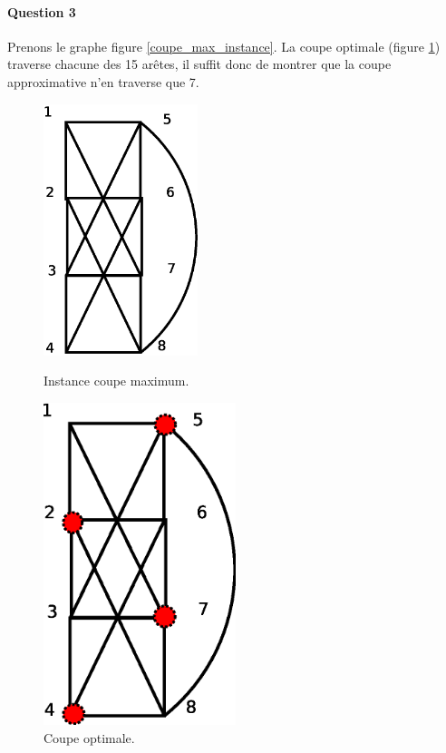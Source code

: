 \paragraph{Question 3}

Prenons le graphe figure \ref{coupe_max_instance}. La coupe optimale
(figure \ref{coupe_max_opt}) traverse chacune des 15 arêtes, il suffit
donc de montrer que la coupe approximative n'en traverse que 7.

\begin{figure}[ht]
\begin{minipage}[b]{0.5\linewidth}
\centering
\centering
\includegraphics[width=0.4\textwidth]{../images/exo4.eps}
\caption{Instance coupe maximum.}
\label{coupe_max_instance}
\end{minipage}
\hspace{0.5cm}
\begin{minipage}[b]{0.4\linewidth}
\centering
\includegraphics[width=0.5\textwidth]{../images/exo4_opt.eps}
\caption{Coupe optimale.}
\label{coupe_max_opt}
\end{minipage}
\end{figure}


